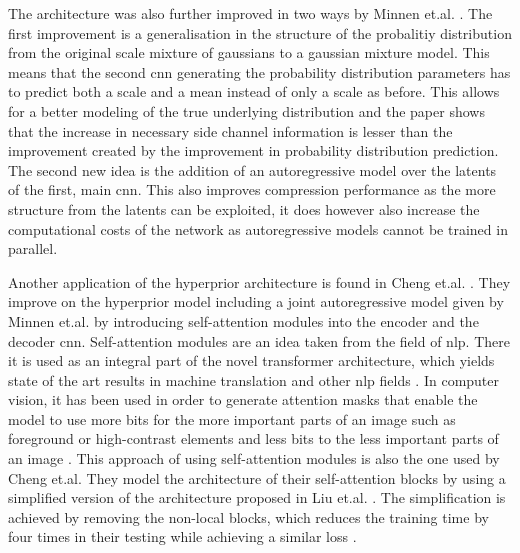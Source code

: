The architecture was also further improved in two ways by Minnen et.al. \citep{minnen_joint_2018}. The first improvement is a generalisation in the structure of the probalitiy distribution from the original scale mixture of gaussians \citep{wainwright_scale_1999} to a gaussian mixture model. This means that the second \ac{cnn} generating the probability distribution parameters has to predict both a scale and a mean instead of only a scale as before. This allows for a better modeling of the true underlying distribution and the paper shows that the increase in necessary side channel information is lesser than the improvement created by the improvement in probability distribution prediction.
The second new idea is the addition of an autoregressive model over the latents of the first, main \ac{cnn}. This also improves compression performance as the more structure from the latents can be exploited, it does however also increase the computational costs of the network as autoregressive models cannot be trained in parallel. 

Another application of the hyperprior architecture is found in Cheng et.al. \citep{cheng_learned_2020}. They improve on the hyperprior model including a joint autoregressive model given by Minnen et.al. \citep{minnen_joint_2018} by introducing self-attention modules into the encoder and the decoder \ac{cnn}. Self-attention modules are an idea taken from the field of \ac{nlp}. There it is used as an integral part of the novel transformer architecture, which yields state of the art results in machine translation and other \ac{nlp} fields \citep{vaswani_attention_2017}. In computer vision, it has been used in order to generate attention masks that enable the model to use more bits for the more important parts of an image such as foreground or high-contrast elements and less bits to the less important parts of an image \citep{liu_non-local_2019}\citep{li_learning_2017}\citep{mentzer_conditional_2019}. This approach of using self-attention modules is also the one used by Cheng et.al. They model the architecture of their self-attention blocks by using a simplified version of the architecture proposed in Liu et.al. \citep{liu_non-local_2019}. The simplification is achieved by removing the non-local blocks, which reduces the training time by four times in their testing while achieving a similar loss \citep{cheng_learned_2020}.